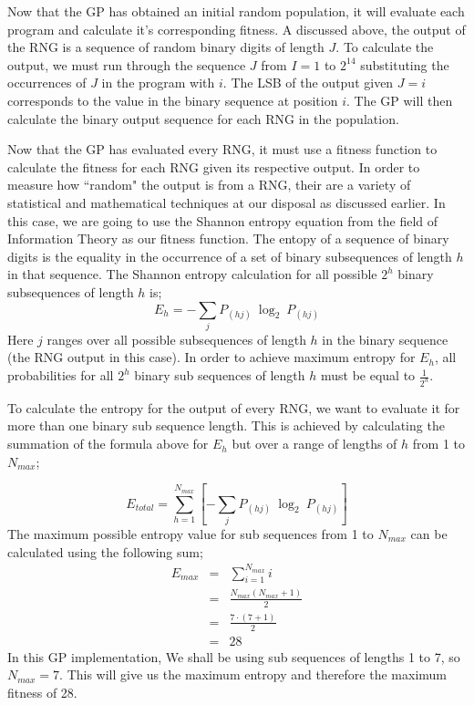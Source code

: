\documentclass[a4paper,10.5pt]{article}
\begin{document}
Now that the GP has obtained an initial random population, it will evaluate each program and calculate it's corresponding fitness. A discussed above, the output of the RNG is a sequence of random binary digits of length $J$. To calculate the output, we must run through the sequence $J$ from $I = 1$ to $2^{14}$ substituting the occurrences of $J$ in the program with $i$. The LSB of the output given $J = i$ corresponds to the value in the binary sequence at position $i$. The GP will then calculate the binary output sequence for each RNG in the population. 

Now that the GP has evaluated every RNG, it must use a fitness function to calculate the fitness for each RNG given its respective output. In order to measure how ``random" the output is from a RNG, their are a variety of statistical and mathematical techniques at our disposal as discussed earlier. In this case, we are going to use the Shannon entropy equation from the field of Information Theory as our fitness function. The entopy of a sequence of binary digits is the equality in the occurrence of a set of binary subsequences of length $h$ in that sequence. The Shannon entropy calculation for all possible $2^h$ binary subsequences of length $h$ is;
\begin{equation*}
E_{h} = - \sum_{j} P_{(hj)}\ \log_2\ P_{(hj)}
\end{equation*}
Here $j$ ranges over all possible subsequences of length $h$ in the binary sequence (the RNG output in this case). In order to achieve maximum entropy for $E_h$, all probabilities for all $2^h$ binary sub sequences of length $h$ must be equal to $\frac{1}{2^h}$.

To calculate the entropy for the output of every RNG, we want to evaluate it for more than one binary sub sequence length. This is achieved by calculating the summation of the formula above for $E_h$ but over a range of lengths of $h$ from 1 to $N_{max}$; 

\begin{equation*}
E_{total} = \sum_{h = 1}^{N_{max}} \left[ - \sum_{j} P_{(hj)}\ \log_2\ P_{(hj)} \right]
\end{equation*}
The maximum possible entropy value for sub sequences from 1 to $N_{max}$ can be calculated using the following sum;
\begin{eqnarray*}
E_{max} &=& \sum_{i = 1}^{N_{max}} i
\\ &=& \frac{N_{max}(N_{max} + 1)}{2}
\\ &=& \frac{7 \cdot (7 + 1)}{2}
\\ &=& 28
\end{eqnarray*}
In this GP implementation, We shall be using sub sequences of lengths 1 to 7, so $N_{max} = 7$. This will give us the maximum entropy and therefore the maximum fitness of 28.
\end{document}
